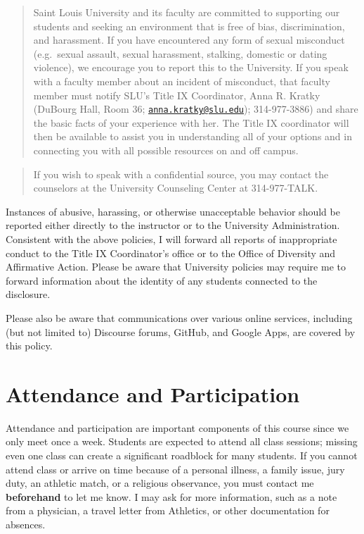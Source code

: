 \documentclass[]{book}
\begin{document}
\begin{quote}
Saint Louis University and its faculty are committed to supporting our students and seeking an environment that is free of bias, discrimination, and harassment. If you have encountered any form of sexual misconduct (e.g.~sexual assault, sexual harassment, stalking, domestic or dating violence), we encourage you to report this to the University. If you speak with a faculty member about an incident of misconduct, that faculty member must notify SLU's Title IX Coordinator, Anna R. Kratky (DuBourg Hall, Room 36; \href{mailto:anna.kratky@slu.edu}{\nolinkurl{anna.kratky@slu.edu}}); 314-977-3886) and share the basic facts of your experience with her. The Title IX coordinator will then be available to assist you in understanding all of your options and in connecting you with all possible resources on and off campus.
\end{quote}

\begin{quote}
If you wish to speak with a confidential source, you may contact the counselors at the University Counseling Center at 314-977-TALK.
\end{quote}

Instances of abusive, harassing, or otherwise unacceptable behavior should be reported either directly to the instructor or to the University Administration. Consistent with the above policies, I will forward all reports of inappropriate conduct to the Title IX Coordinator's office or to the Office of Diversity and Affirmative Action. Please be aware that University policies may require me to forward information about the identity of any students connected to the disclosure.

Please also be aware that communications over various online services, including (but not limited to) Discourse forums, GitHub, and Google Apps, are covered by this policy.

\hypertarget{attendance-and-participation}{%
\section{Attendance and Participation}\label{attendance-and-participation}}

Attendance and participation are important components of this course since we only meet once a week. Students are expected to attend all class sessions; missing even one class can create a significant roadblock for many students. If you cannot attend class or arrive on time because of a personal illness, a family issue, jury duty, an athletic match, or a religious observance, you must contact me \textbf{beforehand} to let me know. I may ask for more information, such as a note from a physician, a travel letter from Athletics, or other documentation for absences.
\end{document}
